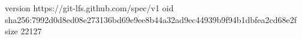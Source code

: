 version https://git-lfs.github.com/spec/v1
oid sha256:7992d0d8ed08e273136bd69e9ee8b44a32ad9ec44939b9f94b1dbfea2cd68e2f
size 22127
